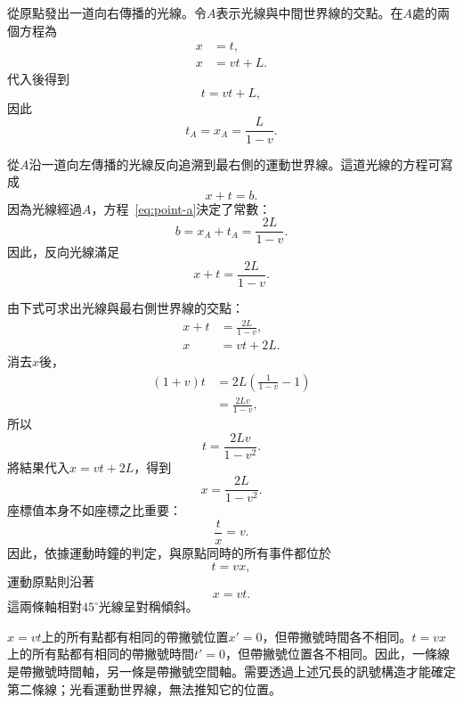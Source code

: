 從原點發出一道向右傳播的光線。令\(A\)表示光線與中間世界線的交點。在\(A\)處的兩個方程為
\begin{align}
x&=t,\\
x&=vt+L.
\end{align}
代入後得到
\begin{equation}
t=vt+L,
\end{equation}
因此
\begin{equation}
t_A=x_A=\frac{L}{1-v}.
\label{eq:point-a}
\end{equation}

從\(A\)沿一道向左傳播的光線反向追溯到最右側的運動世界線。這道光線的方程可寫成
\begin{equation}
x+t=b.
\end{equation}
因為光線經過\(A\)，方程~\eqref{eq:point-a}決定了常數：
\begin{equation}
b=x_A+t_A=\frac{2L}{1-v}.
\end{equation}
因此，反向光線滿足
\begin{equation}
x+t=\frac{2L}{1-v}.
\label{eq:backward-ray}
\end{equation}

由下式可求出光線與最右側世界線的交點：
\begin{align}
x+t&=\frac{2L}{1-v},\\
x&=vt+2L.
\end{align}
消去\(x\)後，
\begin{align}
(1+v)t
  &=2L\left(\frac{1}{1-v}-1\right)\\
  &=\frac{2Lv}{1-v},
\end{align}
所以
\begin{equation}
t=\frac{2Lv}{1-v^2}.
\end{equation}
將結果代入\(x=vt+2L\)，得到
\begin{equation}
x=\frac{2L}{1-v^2}.
\end{equation}
座標值本身不如座標之比重要：
\begin{equation}
\frac{t}{x}=v.
\end{equation}
因此，依據運動時鐘的判定，與原點同時的所有事件都位於
\begin{equation}
t=vx,
\label{eq:simultaneity-c-one}
\end{equation}
運動原點則沿著
\begin{equation}
x=vt.
\label{eq:moving-time-axis}
\end{equation}
這兩條軸相對\(45^\circ\)光線呈對稱傾斜。

\(x=vt\)上的所有點都有相同的帶撇號位置\(x'=0\)，但帶撇號時間各不相同。\(t=vx\)上的所有點都有相同的帶撇號時間\(t'=0\)，但帶撇號位置各不相同。因此，一條線是帶撇號時間軸，另一條是帶撇號空間軸。需要透過上述冗長的訊號構造才能確定第二條線；光看運動世界線，無法推知它的位置。

